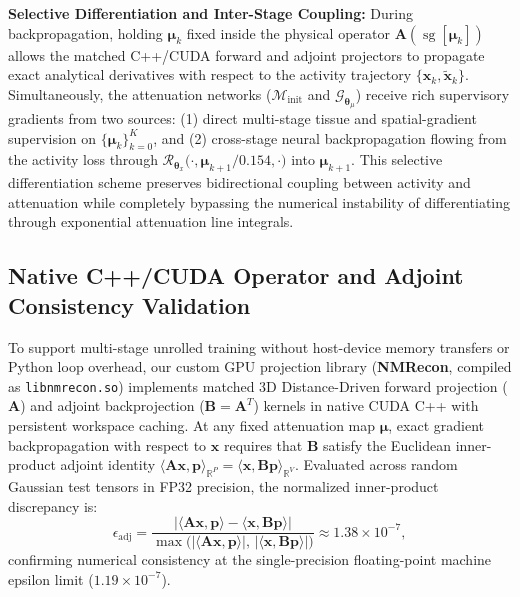 \documentclass[11pt, a4paper]{article}
\begin{document}
\textbf{Selective Differentiation and Inter-Stage Coupling:} During backpropagation, holding $\boldsymbol{\mu}_k$ fixed inside the physical operator $\mathbf{A}(\operatorname{sg}[\boldsymbol{\mu}_k])$ allows the matched C++/CUDA forward and adjoint projectors to propagate exact analytical derivatives with respect to the activity trajectory $\{\mathbf{x}_k, \widetilde{\mathbf{x}}_k\}$. Simultaneously, the attenuation networks ($\mathcal{M}_{\text{init}}$ and $\mathcal{G}_{\boldsymbol{\theta}_\mu}$) receive rich supervisory gradients from two sources: (1) direct multi-stage tissue and spatial-gradient supervision on $\{\boldsymbol{\mu}_k\}_{k=0}^K$, and (2) cross-stage neural backpropagation flowing from the activity loss through $\mathcal{R}_{\boldsymbol{\theta}_x}\big(\cdot, \boldsymbol{\mu}_{k+1}/0.154, \cdot\big)$ into $\boldsymbol{\mu}_{k+1}$. This selective differentiation scheme preserves bidirectional coupling between activity and attenuation while completely bypassing the numerical instability of differentiating through exponential attenuation line integrals.

\subsection{Native C++/CUDA Operator and Adjoint Consistency Validation}
To support multi-stage unrolled training without host-device memory transfers or Python loop overhead, our custom GPU projection library (\textbf{NMRecon}, compiled as \texttt{libnmrecon.so}) implements matched 3D Distance-Driven forward projection ($\mathbf{A}$) and adjoint backprojection ($\mathbf{B} = \mathbf{A}^T$) kernels in native CUDA C++ with persistent workspace caching. At any fixed attenuation map $\boldsymbol{\mu}$, exact gradient backpropagation with respect to $\mathbf{x}$ requires that $\mathbf{B}$ satisfy the Euclidean inner-product adjoint identity $\langle \mathbf{A}\mathbf{x}, \mathbf{p} \rangle_{\mathbb{R}^P} = \langle \mathbf{x}, \mathbf{B}\mathbf{p} \rangle_{\mathbb{R}^V}$. Evaluated across random Gaussian test tensors in FP32 precision, the normalized inner-product discrepancy is:
\begin{equation}
\epsilon_{\text{adj}} = \frac{\big| \langle \mathbf{A}\mathbf{x}, \mathbf{p} \rangle - \langle \mathbf{x}, \mathbf{B}\mathbf{p} \rangle \big|}{\max\!\big( |\langle \mathbf{A}\mathbf{x}, \mathbf{p} \rangle|, \, |\langle \mathbf{x}, \mathbf{B}\mathbf{p} \rangle| \big)} \approx 1.38 \times 10^{-7},
\end{equation}
confirming numerical consistency at the single-precision floating-point machine epsilon limit ($1.19 \times 10^{-7}$).
\end{document}
